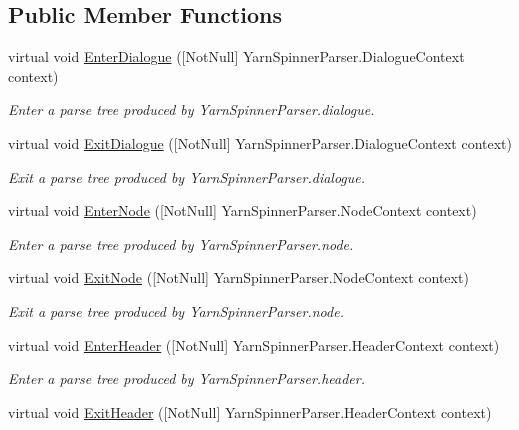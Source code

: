 \subsection*{Public Member Functions}
\begin{DoxyCompactItemize}
\item 
virtual void \hyperlink{a00190_aaeec4ce9cbf5b95d429afab145b57953}{Enter\-Dialogue} (\mbox{[}Not\-Null\mbox{]} Yarn\-Spinner\-Parser.\-Dialogue\-Context context)
\begin{DoxyCompactList}\small\item\em Enter a parse tree produced by Yarn\-Spinner\-Parser.\-dialogue. \end{DoxyCompactList}\item 
virtual void \hyperlink{a00190_adb3910abdd76dca4b087ccbeda671cad}{Exit\-Dialogue} (\mbox{[}Not\-Null\mbox{]} Yarn\-Spinner\-Parser.\-Dialogue\-Context context)
\begin{DoxyCompactList}\small\item\em Exit a parse tree produced by Yarn\-Spinner\-Parser.\-dialogue. \end{DoxyCompactList}\item 
virtual void \hyperlink{a00190_a3729f55225c9447ae4add58d2d548917}{Enter\-Node} (\mbox{[}Not\-Null\mbox{]} Yarn\-Spinner\-Parser.\-Node\-Context context)
\begin{DoxyCompactList}\small\item\em Enter a parse tree produced by Yarn\-Spinner\-Parser.\-node. \end{DoxyCompactList}\item 
virtual void \hyperlink{a00190_a4a181214b03baf8e44df0d66e25d70f2}{Exit\-Node} (\mbox{[}Not\-Null\mbox{]} Yarn\-Spinner\-Parser.\-Node\-Context context)
\begin{DoxyCompactList}\small\item\em Exit a parse tree produced by Yarn\-Spinner\-Parser.\-node. \end{DoxyCompactList}\item 
virtual void \hyperlink{a00190_a78dc9c70370b2ea9432cd42ffb3e9fb4}{Enter\-Header} (\mbox{[}Not\-Null\mbox{]} Yarn\-Spinner\-Parser.\-Header\-Context context)
\begin{DoxyCompactList}\small\item\em Enter a parse tree produced by Yarn\-Spinner\-Parser.\-header. \end{DoxyCompactList}\item 
virtual void \hyperlink{a00190_a6e202bf625b40c0aae4829c9b7200fe9}{Exit\-Header} (\mbox{[}Not\-Null\mbox{]} Yarn\-Spinner\-Parser.\-Header\-Context context)

\end{DoxyCompactItemize}
